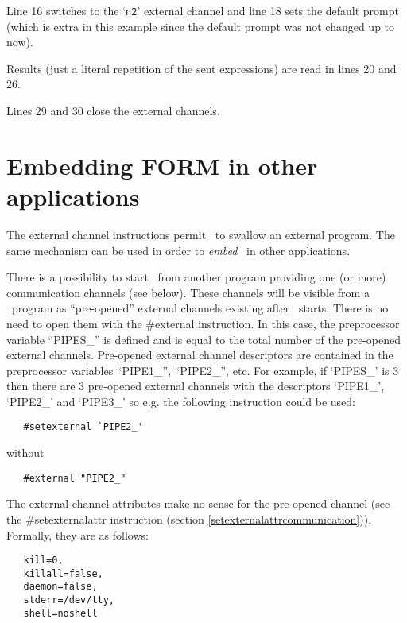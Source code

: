 Line 16 switches to the `\verb|n2|' external channel and line 18 sets
the default prompt (which is extra in this example since the default
prompt was not changed up to now).

Results (just a literal repetition of the sent expressions) are read
in lines 20 and 26.

Lines 29 and 30 close the external channels.


\section{Embedding FORM in other applications}
\label{embeddingcommunication}

The external channel instructions permit \FORM\ to swallow an external 
program. The same mechanism can be used in order to {\em 
embed} \FORM\ in other applications.

There is a possibility to start \FORM\ from another program providing
one (or more) communication channels (see below). These channels will be 
visible from a \FORM\ program as
``pre-opened'' external channels 
existing after \FORM\ starts. There is no need to open them with the 
\#external instruction.
In this case, the preprocessor variable ``PIPES\_'' is 
defined and is equal to the total number of the pre-opened external 
channels. Pre-opened external channel descriptors are contained in the 
preprocessor 
variables ``PIPE1\_'', ``PIPE2\_'', etc.
For example, if `PIPES\_' is 3 then there are 3 
pre-opened external channels with the descriptors `PIPE1\_',
`PIPE2\_' and `PIPE3\_' so e.g. the following instruction could
be used:
\begin{verbatim}
   #setexternal `PIPE2_'
\end{verbatim}
without 
\begin{verbatim}
   #external "PIPE2_"
\end{verbatim}

The external channel attributes make no sense for the pre-opened channel 
(see the \#setexternalattr instruction (section 
\ref{setexternalattrcommunication})).
Formally, they are as follows:
\begin{verbatim}
   kill=0,
   killall=false,
   daemon=false,
   stderr=/dev/tty,
   shell=noshell
\end{verbatim}

